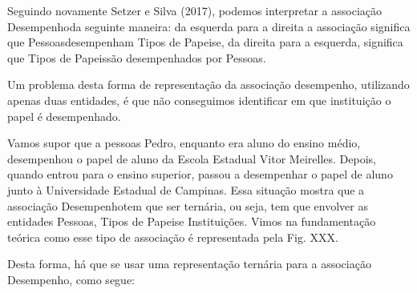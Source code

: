 \documentclass[
12pt,		%
openright,	%
twoside,  %
a4paper,			%
chapter=TITLE,		%
english,			%
french,				%
spanish,			%
brazil				%
]{USPSC-classe/USPSC}
\begin{document}

Seguindo novamente  Setzer e Silva (2017), podemos interpretar a associa\c{c}\~ao \textquotedbl Desempenho\textquotedbl  da seguinte maneira: da esquerda para a direita a associa\c{c}\~ao significa que \textquotedbl Pessoas\textquotedbl  desempenham \textquotedbl Tipos de Papeis\textquotedbl  e, da direita para a esquerda, significa que \textquotedbl Tipos de Papeis\textquotedbl  s\~ao desempenhados por \textquotedbl Pessoas\textquotedbl .


Um problema desta forma de representa\c{c}\~ao da associa\c{c}\~ao desempenho, utilizando apenas duas entidades, \'e que n\~ao conseguimos identificar em que institui\c{c}\~ao o papel \'e desempenhado.


Vamos supor que a pessoas \textquotedbl Pedro\textquotedbl , enquanto era aluno do ensino m\'edio, desempenhou o papel de aluno da Escola Estadual Vitor Meirelles. Depois, quando entrou para o ensino superior, passou a desempenhar o papel de aluno junto \`a Universidade Estadual de Campinas. Essa situa\c{c}\~ao mostra que a associa\c{c}\~ao \textquotedbl Desempenho\textquotedbl  tem que ser tern\'aria, ou seja, tem que envolver as entidades \textquotedbl Pessoas\textquotedbl , \textquotedbl Tipos de Papeis\textquotedbl  e \textquotedbl Institui\c{c}\~oes\textquotedbl . Vimos na fundamenta\c{c}\~ao te\'orica como esse tipo de associa\c{c}\~ao \'e representada pela Fig. XXX.


Desta forma, h\'a que se usar uma representa\c{c}\~ao tern\'aria para a associa\c{c}\~ao \textquotedbl Desempenho\textquotedbl , como segue:



\end{document}

